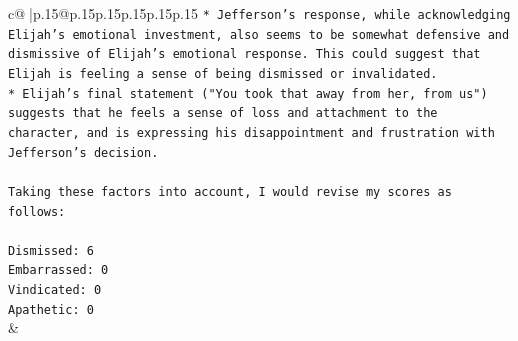 \documentclass{article}
\begin{document}
{\begin{supertabular}{c@{$\;$}|p{.15\linewidth}@{}p{.15\linewidth}p{.15\linewidth}p{.15\linewidth}p{.15\linewidth}p{.15\linewidth}}
{{{\texttt{* Jefferson's response, while acknowledging Elijah's emotional investment, also seems to be somewhat defensive and dismissive of Elijah's emotional response. This could suggest that Elijah is feeling a sense of being dismissed or invalidated.} \\
\texttt{* Elijah's final statement ("You took that away from her, from us") suggests that he feels a sense of loss and attachment to the character, and is expressing his disappointment and frustration with Jefferson's decision.} \\
\\ 
\texttt{Taking these factors into account, I would revise my scores as follows:} \\
\\ 
\texttt{Dismissed: 6} \\
\texttt{Embarrassed: 0} \\
\texttt{Vindicated: 0} \\
\texttt{Apathetic: 0} \\
            }
        }
    }
    & \\ \\

\end{supertabular}
}
\end{document}
